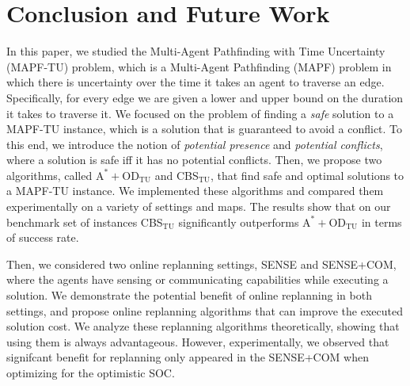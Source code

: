 \documentclass[jair,twoside,11pt,theapa]{article}
\newcommand{\odatu}{$\mathrm{A^{*}+OD_{TU}}$\xspace}
\newcommand{\cbstu}{CBS$\mathrm{_{TU}}$\xspace}
\newcommand{\mapftu}{MAPF-TU\xspace}
\newcommand{\sense}{SENSE\xspace}
\newcommand{\sensecom}{SENSE+COM\xspace}
\newtheorem{theorem}{Theorem}
\begin{document}




\section{Conclusion and Future Work}

In this paper, we studied the Multi-Agent Pathfinding with Time Uncertainty (\mapftu) problem, which is a Multi-Agent Pathfinding (MAPF) problem in which there is uncertainty over the time it takes an agent to traverse an edge. 
Specifically, for every edge we are given a lower and upper bound on the duration it takes to traverse it. 
We focused on the problem of finding a \emph{safe} solution to a \mapftu instance, which is a solution that is guaranteed to avoid a conflict. 
To this end, we introduce the notion of \emph{potential presence} and \emph{potential conflicts}, where a solution is safe iff it has no potential conflicts. Then, we propose two algorithms, called \odatu and \cbstu, that find safe and optimal solutions to a \mapftu instance. 
We implemented these algorithms and compared them experimentally on a variety of settings and maps. The results show that on our benchmark set of instances \cbstu significantly outperforms \odatu in terms of success rate. 

Then, we considered two online replanning settings, \sense and \sensecom, where the agents have sensing or communicating capabilities while executing a solution. We demonstrate the potential benefit of online replanning in both settings, and propose online replanning algorithms that can improve the executed solution cost. We analyze these replanning algorithms theoretically, showing that using them is always advantageous. However, experimentally, we observed that signifcant benefit for replanning only appeared in the \sensecom when optimizing for the optimistic SOC. 
\end{document}
